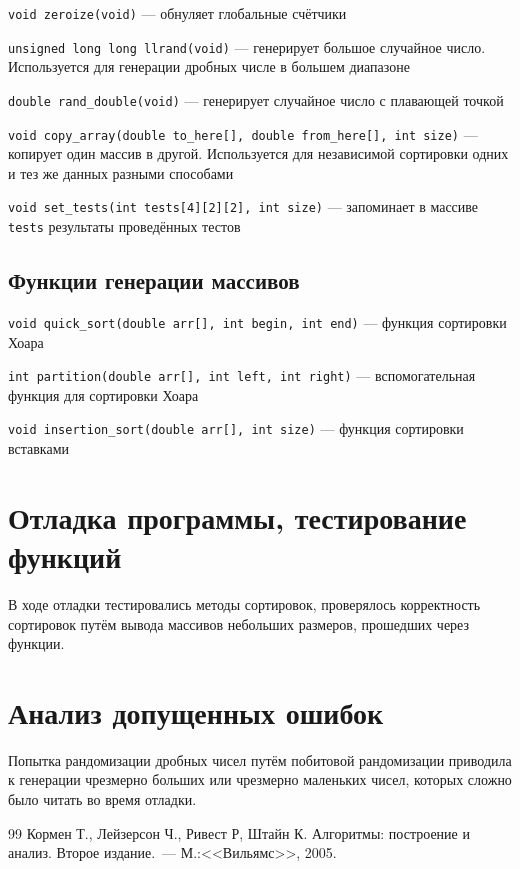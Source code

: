 \documentclass[a4paper,12pt,titlepage,finall]{article}
\begin{document}
\texttt{void zeroize(void)} — обнуляет глобальные счётчики

\texttt{unsigned long long llrand(void)} — генерирует большое случайное число. Используется для генерации дробных числе в большем диапазоне

\texttt{double rand\_double(void)} — генерирует случайное число с плавающей точкой

\texttt{void copy\_array(double to\_here[], double from\_here[], int size)} — копирует один массив в другой. Используется для независимой сортировки одних и тез же данных разными способами

\texttt{void set\_tests(int tests[4][2][2], int size)} — запоминает в массиве \texttt{tests} результаты проведённых тестов

\subsection{Функции генерации массивов}

\texttt{void quick\_sort(double arr[], int begin, int end)} — функция сортировки Хоара

\texttt{int partition(double arr[], int left, int right)} — вспомогательная функция для сортировки Хоара

\texttt{void insertion\_sort(double arr[], int size)} — функция сортировки вставками

\section{Отладка программы, тестирование функций}
В ходе отладки тестировались методы сортировок, проверялось корректность сортировок путём вывода массивов небольших размеров, прошедших через функции.

\section{Анализ допущенных ошибок}
Попытка рандомизации дробных чисел путём побитовой рандомизации приводила к генерации чрезмерно больших или чрезмерно маленьких чисел, которых сложно было читать во время отладки.

\begin{raggedright}
\begin{thebibliography}{99}
 Кормен Т., Лейзерсон Ч., Ривест Р, Штайн К. Алгоритмы: построение и анализ.
    Второе издание.~--- М.:<<Вильямс>>, 2005.
\end{thebibliography}
\end{raggedright}
\end{document}
